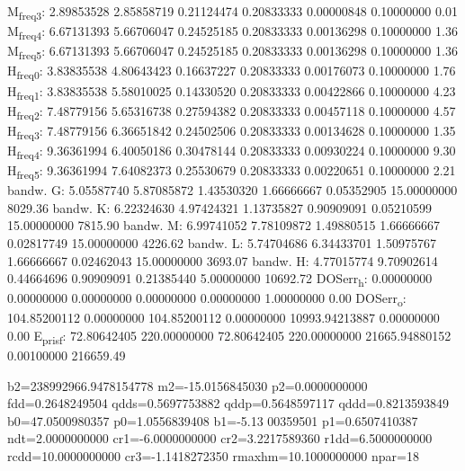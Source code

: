 \documentclass[11pt]{article}
\begin{document}
M\textsubscript{freq}\textsubscript{3}:   2.89853528   2.85858719   0.21124474   0.20833333   0.00000848   0.10000000         0.01
M\textsubscript{freq}\textsubscript{4}:   6.67131393   5.66706047   0.24525185   0.20833333   0.00136298   0.10000000         1.36
M\textsubscript{freq}\textsubscript{5}:   6.67131393   5.66706047   0.24525185   0.20833333   0.00136298   0.10000000         1.36
H\textsubscript{freq}\textsubscript{0}:   3.83835538   4.80643423   0.16637227   0.20833333   0.00176073   0.10000000         1.76
H\textsubscript{freq}\textsubscript{1}:   3.83835538   5.58010025   0.14330520   0.20833333   0.00422866   0.10000000         4.23
H\textsubscript{freq}\textsubscript{2}:   7.48779156   5.65316738   0.27594382   0.20833333   0.00457118   0.10000000         4.57
H\textsubscript{freq}\textsubscript{3}:   7.48779156   6.36651842   0.24502506   0.20833333   0.00134628   0.10000000         1.35
H\textsubscript{freq}\textsubscript{4}:   9.36361994   6.40050186   0.30478144   0.20833333   0.00930224   0.10000000         9.30
H\textsubscript{freq}\textsubscript{5}:   9.36361994   7.64082373   0.25530679   0.20833333   0.00220651   0.10000000         2.21
bandw. G:   5.05587740   5.87085872   1.43530320   1.66666667   0.05352905  15.00000000      8029.36
bandw. K:   6.22324630   4.97424321   1.13735827   0.90909091   0.05210599  15.00000000      7815.90
bandw. M:   6.99741052   7.78109872   1.49880515   1.66666667   0.02817749  15.00000000      4226.62
bandw. L:   5.74704686   6.34433701   1.50975767   1.66666667   0.02462043  15.00000000      3693.07
bandw. H:   4.77015774   9.70902614   0.44664696   0.90909091   0.21385440   5.00000000     10692.72
DOSerr\textsubscript{h}:   0.00000000   0.00000000   0.00000000   0.00000000   0.00000000   1.00000000         0.00
DOSerr\textsubscript{o}: 104.85200112   0.00000000 104.85200112   0.00000000 10993.94213887   0.00000000         0.00
E\textsubscript{pris}\textsubscript{f}:  72.80642405 220.00000000  72.80642405 220.00000000 21665.94880152   0.00100000    216659.49

  b2=238992966.9478154778 m2=-15.0156845030 p2=0.0000000000 fdd=0.2648249504 qdds=0.5697753882 qddp=0.5648597117 qddd=0.8213593849 b0=47.0500980357 p0=1.0556839408 b1=-5.13
00359501 p1=0.6507410387 ndt=2.0000000000 cr1=-6.0000000000 cr2=3.2217589360 r1dd=6.5000000000 rcdd=10.0000000000 cr3=-1.1418272350 rmaxhm=10.1000000000 npar=18 
\end{document}

